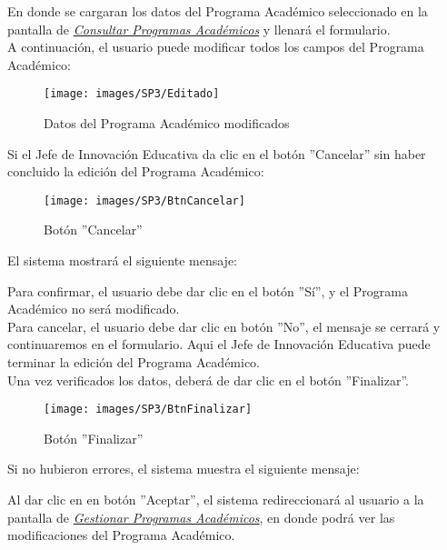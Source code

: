         En donde se cargaran los datos del Programa Académico seleccionado en la pantalla de \hyperlink{consultarpa}{\textit{Consultar Programas Académicos}} y llenará el formulario.\\

        A continuación, el usuario puede modificar todos los campos del Programa Académico:
        \begin{figure}[!hbtp]
        	\centering
        	\hypertarget{modif}{\texttt{[image: images/SP3/Editado]}}
        	\caption{Datos del Programa Académico modificados}
        	\label{modif}
        \end{figure}

        Si el Jefe de Innovación Educativa da clic en el botón ''Cancelar'' sin haber concluido la edición del Programa Académico:

        \begin{figure}[!hbtp]
        	\centering
        	\hypertarget{cancel2}{\texttt{[image: images/SP3/BtnCancelar]}}
        	\caption{Botón ''Cancelar''}
        	\label{cancel2}
        \end{figure}

        El sistema mostrará el siguiente mensaje:

        Para confirmar, el usuario debe dar clic en el botón ''Sí'', y el Programa Académico no será modificado.\\

        Para cancelar, el usuario debe dar clic en botón ''No'', el mensaje se cerrará y continuaremos en el formulario. Aqui el Jefe de Innovación Educativa puede terminar la edición del Programa Académico.\\

        Una vez verificados los datos, deberá de dar clic en el botón ''Finalizar''.
        \begin{figure}[!hbtp]
        	\centering
        	\hypertarget{btnfin}{\texttt{[image: images/SP3/BtnFinalizar]}}
        	\caption{Botón ''Finalizar''}
        	\label{btnfin}
        \end{figure}

        Si no hubieron errores, el sistema muestra el siguiente mensaje:

        Al dar clic en en botón ''Aceptar'', el sistema redireccionará al usuario a la pantalla de \hyperlink{consultarpa}{\textit{Gestionar Programas Académicos}}, en donde podrá ver las modificaciones del Programa Académico.\\

